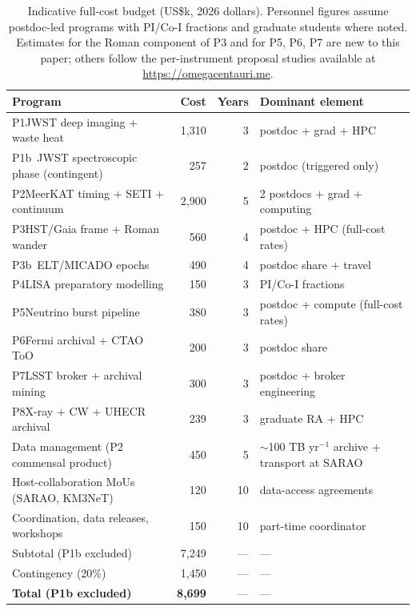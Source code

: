 \documentclass[11pt]{article}
\begin{document}
\begin{table}[tbp]
\centering
\caption{Indicative full-cost budget (US\$k, 2026 dollars). Personnel figures assume postdoc-led programs with PI/Co-I fractions and graduate students where noted. Estimates for the Roman component of P3 and for P5, P6, P7 are new to this paper; others follow the per-instrument proposal studies available at \url{https://omegacentauri.me}.}
\label{tab:cost}
\small
\begin{tabular}{p{6.2cm}rrl}
\toprule
Program & Cost & Years & Dominant element \\
\midrule
P1\quad JWST deep imaging + waste heat & 1{,}310 & 3 & postdoc + grad + HPC \\
P1b\;\, JWST spectroscopic phase (contingent) & 257 & 2 & postdoc (triggered only) \\
P2\quad MeerKAT timing + SETI + continuum & 2{,}900 & 5 & 2 postdocs + grad + computing \\
P3\quad HST/Gaia frame + Roman wander & 560 & 4 & postdoc + HPC (full-cost rates) \\
P3b\;\, ELT/MICADO epochs & 490 & 4 & postdoc share + travel \\
P4\quad LISA preparatory modelling & 150 & 3 & PI/Co-I fractions \\
P5\quad Neutrino burst pipeline & 380 & 3 & postdoc + compute (full-cost rates) \\
P6\quad Fermi archival + CTAO ToO & 200 & 3 & postdoc share \\
P7\quad LSST broker + archival mining & 300 & 3 & postdoc + broker engineering \\
P8\quad X-ray + CW + UHECR archival & 239 & 3 & graduate RA + HPC \\
Data management (P2 commensal product) & 450 & 5 & $\sim$100 TB yr$^{-1}$ archive + transport at SARAO \\
Host-collaboration MoUs (SARAO, KM3NeT) & 120 & 10 & data-access agreements \\
Coordination, data releases, workshops & 150 & 10 & part-time coordinator \\
\midrule
Subtotal (P1b excluded) & 7{,}249 & --- & --- \\
Contingency (20\%) & 1{,}450 & --- & --- \\
\midrule
\textbf{Total (P1b excluded)} & \textbf{8{,}699} & --- & --- \\
\bottomrule
\end{tabular}
\end{table}
\end{document}
